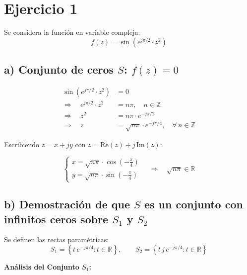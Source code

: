 \documentclass[12pt,a4paper]{article}
\begin{document}
\section{Ejercicio 1}
 
Se considera la función en variable compleja:
\[
    f(z) = \sin\!\left(e^{j\pi/2} \cdot z^{2}\right)
\]
 
\subsection {a) Conjunto de ceros $S$: $f(z) = 0$}
 
\begin{align*}
    \sin\!\left(e^{j\pi/2} \cdot z^{2}\right) &= 0 \\[6pt]
    \Rightarrow \quad e^{j\pi/2} \cdot z^{2} &= n\pi, \quad n \in \mathbb{Z} \\[6pt]
    \Rightarrow \quad z^{2} &= n\pi \cdot e^{-j\pi/2} \\[6pt]
    \Rightarrow \quad z &= \sqrt{n\pi} \cdot e^{-j\pi/4}, \quad \forall\, n \in \mathbb{Z}
\end{align*}
 
Escribiendo $z = x + jy$ con $z = \text{Re}(z) + j\,\text{Im}(z)$:
 
\[
    \begin{cases}
        x = \sqrt{n\pi} \cdot \cos\!\left(-\tfrac{\pi}{4}\right) \\[4pt]
        y = \sqrt{n\pi} \cdot \sin\!\left(-\tfrac{\pi}{4}\right)
    \end{cases}
    \quad \Rightarrow \quad \sqrt{n\pi} \in \mathbb{R}
\]
 
\subsection {b) Demostración de que $S$ es un conjunto con infinitos ceros sobre $S_1$ y $S_2$}
 
Se definen las rectas paramétricas:
\[
    S_1 = \left\{ t\, e^{-j\pi/4} : t \in \mathbb{R} \right\}, \qquad
    S_2 = \left\{ t\,j\, e^{-j\pi/4} : t \in \mathbb{R} \right\}
\]
 
\textbf{Análisis del Conjunto $S_1$:}
 
\end{document}
